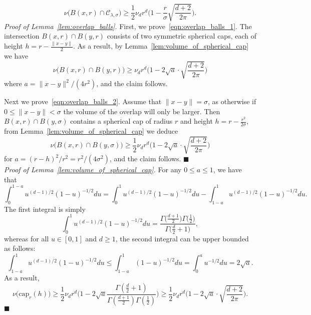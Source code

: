 \documentclass[twoside,11pt]{article}
\newcommand{\1}{\mathbf{1}}
\newcommand{\mc}[1]{\mathcal{#1}}
\newcommand{\qed}{\hfill $\blacksquare$}
\begin{document}
\begin{equation}
\label{eqn:uniform_local_conductance}
\nu\bigl(B(x,r) \cap \mc{C}_{\lambda,\sigma}\bigr) \geq \frac{1}{2} \nu_d r^d\biggl(1 - \frac{r}{\sigma}\sqrt{\frac{d + 2}{2\pi}}\biggr).
\end{equation}  
\emph{Proof of Lemma~\ref{lem:overlap_balls}.}
First, we prove~\eqref{eqn:overlap_balls_1}. The intersection $B(x,r) \cap B(y,r)$ consists of two symmetric spherical caps, each of height $h = r - \frac{\|x - y\|}{2}$. 
As a result, by Lemma~\ref{lem:volume_of_spherical_cap} we have
\begin{equation*}
\nu\bigl(B(x,r) \cap B(y,r)\bigr) \geq \nu_d r^d \bigl(1 - 2\sqrt{a} \cdot \sqrt{\frac{d + 2}{2\pi}}\bigr)
\end{equation*}
where $a = \|x - y\|^2/(4r^2)$, and the claim follows.

Next we prove~\eqref{eqn:overlap_balls_2}. Assume that $\|x - y\| = \sigma$, as otherwise if $0 \leq \|x - y\| < \sigma$ the volume of the overlap will only be larger. Then $B(x,r) \cap B(y,\sigma)$ contains a spherical cap of radius $r$ and height $h = r - \frac{r^2}{2\sigma}$, from Lemma~\ref{lem:volume_of_spherical_cap} we deduce
\begin{equation*}
\nu\bigl(B(x,r) \cap B(y,\sigma)\bigr) \geq \frac{1}{2}\nu_dr^d\biggl(1 - 2\sqrt{a}\cdot\sqrt{\frac{d + 2}{2\pi}}\biggr)
\end{equation*}
for $a = (r - h)^2/r^2 = r^2/(4\sigma^2)$, and the claim follows. \qed \\

\noindent\emph{Proof of Lemma~\ref{lem:volume_of_spherical_cap}.}
For any $0 \leq a \leq 1$, we have that
\begin{equation*}
\int_{0}^{1 - a}u^{(d-1)/2}(1 - u)^{-1/2}du = \int_{0}^{1}u^{(d-1)/2}(1 - u)^{-1/2}du - \int_{1 - a}^{1}u^{(d-1)/2}(1 - u)^{-1/2}du. 
\end{equation*}
The first integral is simply
\begin{equation*}
\int_{0}^{1}u^{(d-1)/2}(1 - u)^{-1/2}du = \frac{\Gamma\bigl(\frac{d + 1}{2}\bigr)\Gamma\bigl(\frac{1}{2}\bigr)}{ \Gamma\bigl(\frac{d}{2}+ 1\bigr)},
\end{equation*}
whereas for all $u \in [0,1]$ and $d \geq 1$, the second integral can be upper bounded as follows:
\begin{equation*}
\int_{1 - a}^{1}u^{(d-1)/2}(1 - u)^{-1/2}du \leq \int_{1 - a}^{1}(1 - u)^{-1/2}du = \int_{0}^{a} u^{-1/2}du = 2\sqrt{a}.
\end{equation*}
As a result, 
\begin{equation*}
\nu\bigl(\mathrm{cap}_r(h)\bigr) \geq \frac{1}{2}\nu_dr^d \biggl(1 - 2\sqrt{a}\frac{\Gamma(\frac{d}{2} + 1)}{\Gamma(\frac{d + 1}{2})\Gamma(\frac{1}{2})}\biggr)  \geq \frac{1}{2}\nu_dr^d \biggl(1 - 2\sqrt{a} \cdot \sqrt{\frac{d + 2}{2\pi}}\biggr).
\end{equation*} \qed
\end{document}

